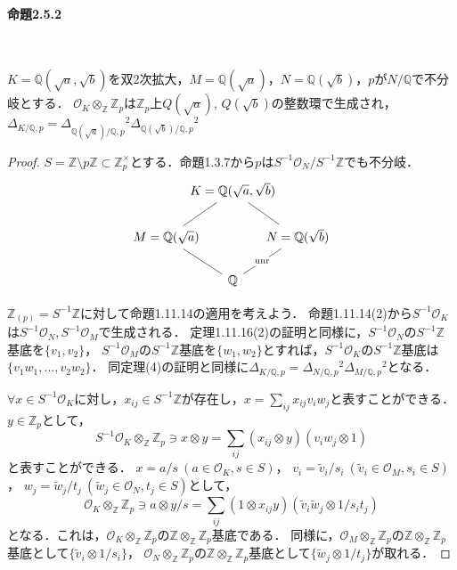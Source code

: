 \paragraph{命題2.5.2}~
\begin{screen}
  $K=\mathbb{Q}(\sqrt{a}, \sqrt{b})$を双$2$次拡大，$M=\mathbb{Q}(\sqrt{a})$，$N=\mathbb{Q}(\sqrt{b})$，$p$が$N/\mathbb{Q}$で不分岐とする．
  $\mathcal{O}_K \otimes_\mathbb{Z} \mathbb{Z}_p$は$\mathbb{Z}_p$上$Q(\sqrt{a})$, $Q(\sqrt{b})$の整数環で生成され，
  $\varDelta_{K/\mathbb{Q}, p}= \varDelta_{\mathbb{Q}(\sqrt{a})/\mathbb{Q}, p}{}^2 \varDelta_{\mathbb{Q}(\sqrt{b})/\mathbb{Q}, p}{}^2$
\end{screen}
\begin{proof}
  $S=\mathbb{Z}\setminus p\mathbb{Z}\subset\mathbb{Z}_p^\times$とする．命題1.3.7から$p$は$S^{-1}\mathcal{O}_N/S^{-1}\mathbb{Z}$でも不分岐．
  \[
  \begin{tikzcd}
    &[-40pt] K=\mathbb{Q}(\sqrt{a}, \sqrt{b}) \arrow[ld, dash]\arrow[rd, dash] \\
    M=\mathbb{Q}(\sqrt{a}) &[-40pt] &[-40pt] N=\mathbb{Q}(\sqrt{b})\\
    &[-40pt] \mathbb{Q} \arrow[ul, dash]\arrow[ur, dash, "\text{unr}" description]
  \end{tikzcd}
  \]

  $\mathbb{Z}_{(p)} = S^{-1}\mathbb{Z}$に対して命題1.11.14の適用を考えよう．
  命題1.11.14(2)から$S^{-1}\mathcal{O}_K$は$S^{-1}\mathcal{O}_N, S^{-1}\mathcal{O}_M$で生成される．
  定理1.11.16(2)の証明と同様に，$S^{-1}\mathcal{O}_N$の$S^{-1}\mathbb{Z}$基底を$\{v_1, v_2\}$，
  $S^{-1}\mathcal{O}_M$の$S^{-1}\mathbb{Z}$基底を$\{w_1, w_2\}$とすれば，$S^{-1}\mathcal{O}_K$の$S^{-1}\mathbb{Z}$基底は$\{v_1w_1, \ldots, v_2w_2\}$．
  同定理(4)の証明と同様に$\varDelta_{K/\mathbb{Q}, p}= \varDelta_{N/\mathbb{Q}, p}{}^2\varDelta_{M/\mathbb{Q}, p}{}^2$となる．

  $\forall x\in S^{-1}\mathcal{O}_K$に対し，$x_{ij}\in S^{-1}\mathbb{Z}$が存在し，$x=\sum_{ij}x_{ij}v_iw_j$と表すことができる．
  $y\in\mathbb{Z}_p$として，
  \[S^{-1}\mathcal{O}_K\otimes_\mathbb{Z}\mathbb{Z}_p\ni x \otimes y = \sum_{ij}(x_{ij} \otimes y)(v_iw_j \otimes 1)\]
  と表すことができる．
  $x=a/s\ (a\in\mathcal{O}_K, s\in S)$，
  $v_i=\tilde{v}_i/s_i\ (\tilde{v}_i\in\mathcal{O}_M, s_i\in S)$，
  $w_j=\tilde{w}_j/t_j\ (\tilde{w}_j\in\mathcal{O}_N, t_j\in S)$として，
  \[\mathcal{O}_K\otimes_\mathbb{Z}\mathbb{Z}_p\ni a \otimes y/s=\sum_{ij}(1 \otimes x_{ij}y)(\tilde{v}_i\tilde{w}_j \otimes 1/s_it_j)\]
  となる．これは，$\mathcal{O}_K\otimes_\mathbb{Z}\mathbb{Z}_p$の$\mathbb{Z}\otimes_\mathbb{Z}\mathbb{Z}_p$基底である．
  同様に，$\mathcal{O}_M\otimes_\mathbb{Z}\mathbb{Z}_p$の$\mathbb{Z}\otimes_\mathbb{Z}\mathbb{Z}_p$基底として$\{\tilde{v}_i \otimes 1/s_i\}$，
  $\mathcal{O}_N\otimes_\mathbb{Z}\mathbb{Z}_p$の$\mathbb{Z}\otimes_\mathbb{Z}\mathbb{Z}_p$基底として$\{\tilde{w}_j \otimes 1/t_j\}$が取れる．


\end{proof}
